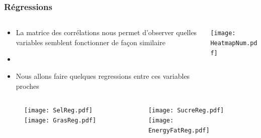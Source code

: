 \subsubsection{Régressions}
\begin{frame}{\insertsubsubsection}
  \begin{columns}
    \begin{column}{.5\textwidth}
      \begin{itemize}
        \item La matrice des corrélations nous permet d'observer quelles variables
              semblent fonctionner de façon similaire
        \item[]
        \item Nous allons faire quelques regressions entre ces variables proches
      \end{itemize}
    \end{column}
    \begin{column}{.5\textwidth}
      \texttt{[image: HeatmapNum.pdf]}
    \end{column}
  \end{columns}
\end{frame}

\begin{frame}{\insertsubsubsection}
  \begin{columns}
    \begin{column}{.5\textwidth}
      \begin{figure}
        \texttt{[image: SelReg.pdf]}
        \texttt{[image: GrasReg.pdf]}
      \end{figure}
    \end{column}
    \begin{column}{.5\textwidth}
      \begin{figure}
        \texttt{[image: SucreReg.pdf]}
        \texttt{[image: EnergyFatReg.pdf]}
      \end{figure}
    \end{column}
  \end{columns}
\end{frame}

